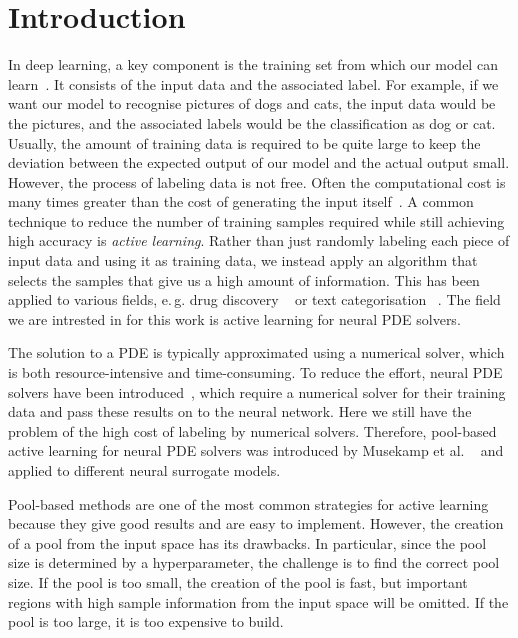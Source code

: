 \chapter{Introduction}
In deep learning, a key component is the training set from which our model can learn~\cite{LeCun2015}. 
It consists of the input data and the associated label. For example, if we want our model to recognise pictures of dogs and cats, the input data would be the pictures, and the associated labels would be the classification as dog or cat.
Usually, the amount of training data is required to be quite large to keep the deviation between the expected output of our model and the actual output small. 
However, the process of labeling data is not free. Often the computational cost is many times greater than the cost of generating the input itself~\cite{settles2009active}. 
A common technique to reduce the number of training samples required while still achieving high accuracy is \textit{active learning}.
Rather than just randomly labeling each piece of input data and using it as training data, 
we instead apply an algorithm that selects the samples that give us a 
high amount of information. 
This has been applied to various fields, e.\,g.\xspace drug discovery ~\cite{REKER201973} 
or text categorisation ~\cite{lewis1995sequential}. The field we are intrested in for this work is active learning for neural PDE solvers.

The solution to a PDE is typically approximated using a numerical solver, which is both resource-intensive and time-consuming. 
To reduce the effort, neural PDE solvers have been introduced~\cite{NEURIPS2023_d529b943}, 
which require a numerical solver for their training data and pass 
these results on to the neural network. Here we still have 
the problem of the high cost of labeling by numerical solvers. 
Therefore, pool-based active learning for neural PDE solvers was introduced 
by Musekamp et al. ~\cite{musekamp2024active} and applied to different neural surrogate models.

Pool-based methods are one of the most common strategies for 
active learning because they give good results and are easy to implement.
However, the creation of a pool from the input space has its drawbacks. 
In particular, since the pool size is determined by a hyperparameter, 
the challenge is to find the correct pool size. If the pool is too small, 
the creation of the pool is fast, but important regions with high sample 
information from the input space will be omitted. If the pool is too large, 
it is too expensive to build. 

